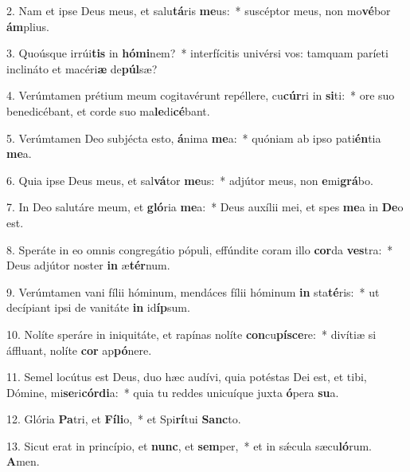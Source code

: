 2. Nam et ipse Deus meus, et salu\textbf{tá}ris \textbf{me}us:~*  suscéptor meus, non mo\textbf{vé}bor \textbf{ám}plius.\

3. Quoúsque irrúi\textbf{tis} in \textbf{hó}\textbf{mi}nem?~*  interfícitis univérsi vos: tamquam paríeti inclináto et macéri\textbf{æ} de\textbf{púl}sæ?\

4. Verúmtamen prétium meum cogitavérunt repéllere, cu\textbf{cúr}ri in \textbf{si}ti:~*  ore suo benedicébant, et corde suo ma\textbf{le}di\textbf{cé}bant.\

5. Verúmtamen Deo subjécta esto, \textbf{á}nima \textbf{me}a:~*  quóniam ab ipso pati\textbf{én}tia \textbf{me}a.\

6. Quia ipse Deus meus, et sal\textbf{vá}tor \textbf{me}us:~*  adjútor meus, non \textbf{e}mi\textbf{grá}bo.\

7. In Deo salutáre meum, et \textbf{gló}ria \textbf{me}a:~*  Deus auxílii mei, et spes \textbf{me}a in \textbf{De}o est.\

8. Speráte in eo omnis congregátio pópuli, effúndite coram illo \textbf{cor}da \textbf{ves}tra:~*  Deus adjútor noster \textbf{in} æ\textbf{tér}num.\

9. Verúmtamen vani fílii hóminum, mendáces fílii hóminum \textbf{in} sta\textbf{té}ris:~*  ut decípiant ipsi de vanitáte \textbf{in} id\textbf{íp}sum.\

10. Nolíte speráre in iniquitáte, et rapínas nolíte \textbf{con}cu\textbf{pí}\textbf{sce}re:~*  divítiæ si áffluant, nolíte \textbf{cor} ap\textbf{pó}nere.\

11. Semel locútus est Deus, duo hæc audívi, quia potéstas Dei est, et tibi, Dómine, mi\textbf{se}ri\textbf{cór}\textbf{di}a:~*  quia tu reddes unicuíque juxta \textbf{ó}pera \textbf{su}a.\

12. Glória \textbf{Pa}tri, et \textbf{Fí}\textbf{li}o,~*  et Spi\textbf{rí}tui \textbf{Sanc}to.\

13. Sicut erat in princípio, et \textbf{nunc}, et \textbf{sem}per,~*  et in sǽcula sæcu\textbf{ló}rum. \textbf{A}men.\

